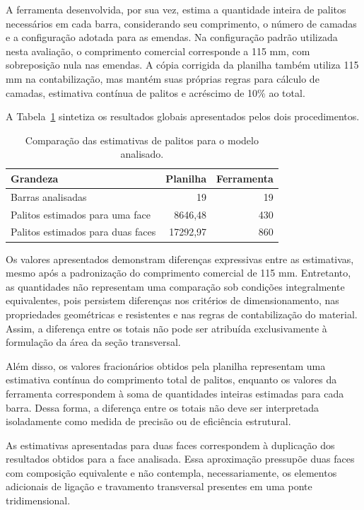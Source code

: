 A ferramenta desenvolvida, por sua vez, estima a quantidade inteira de palitos necessários em cada barra, considerando seu comprimento, o número de camadas e a configuração adotada para as emendas. Na configuração padrão utilizada nesta avaliação, o comprimento comercial corresponde a 115 mm, com sobreposição nula nas emendas. A cópia corrigida da planilha também utiliza 115 mm na contabilização, mas mantém suas próprias regras para cálculo de camadas, estimativa contínua de palitos e acréscimo de 10\% ao total.

A Tabela~\ref{tab:comparacao-totais} sintetiza os resultados globais apresentados pelos dois procedimentos.

\begin{table}[H]
    \centering
    \caption{Comparação das estimativas de palitos
    para o modelo analisado.}
    \label{tab:comparacao-totais}
    \begin{tabular}{p{6cm}r r}
        \hline
        \textbf{Grandeza} &
        \textbf{Planilha} &
        \textbf{Ferramenta} \\
        \hline
        Barras analisadas & 19 & 19 \\
        Palitos estimados para uma face
            & 8646,48 & 430 \\
        Palitos estimados para duas faces
            & 17292,97 & 860 \\
        \hline
    \end{tabular}
\end{table}

Os valores apresentados demonstram diferenças expressivas entre as estimativas, mesmo após a padronização do comprimento comercial de 115 mm. Entretanto, as quantidades não representam uma comparação sob condições integralmente equivalentes, pois persistem diferenças nos critérios de dimensionamento, nas propriedades geométricas e resistentes e nas regras de contabilização do material. Assim, a diferença entre os totais não pode ser atribuída exclusivamente à formulação da área da seção transversal.

Além disso, os valores fracionários obtidos pela planilha representam uma estimativa contínua do comprimento total de palitos, enquanto os valores da ferramenta correspondem à soma de quantidades inteiras estimadas para cada barra. Dessa forma, a diferença entre os totais não deve ser interpretada isoladamente como medida de precisão ou de eficiência estrutural.

As estimativas apresentadas para duas faces correspondem à duplicação dos resultados obtidos para a face analisada. Essa aproximação pressupõe duas faces com composição equivalente e não contempla, necessariamente, os elementos adicionais de ligação e travamento transversal presentes em uma ponte tridimensional.

